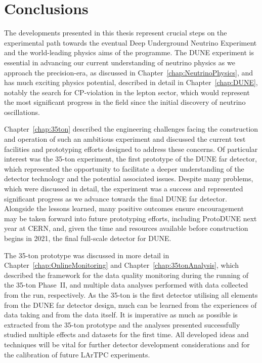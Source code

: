 
\chapter{Conclusions}\label{chap:Conclusions}

The developments presented in this thesis represent crucial steps on the experimental path towards the eventual Deep Underground Neutrino Experiment and the world-leading physics aims of the programme.  The DUNE experiment is essential in advancing our current understanding of neutrino physics as we approach the precision-era, as discussed in Chapter~\ref{chap:NeutrinoPhysics}, and has much exciting physics potential, described in detail in Chapter~\ref{chap:DUNE}, notably the search for CP-violation in the lepton sector, which would represent the most significant progress in the field since the initial discovery of neutrino oscillations.

Chapter~\ref{chap:35ton} described the engineering challenges facing the construction and operation of such an ambitious experiment and discussed the current test facilities and prototyping efforts designed to address these concerns.  Of particular interest was the 35-ton experiment, the first prototype of the DUNE far detector, which represented the opportunity to facilitate a deeper understanding of the detector technology and the potential associated issues.  Despite many problems, which were discussed in detail, the experiment was a success and represented significant progress as we advance towards the final DUNE far detector.  Alongside the lessons learned, many positive outcomes ensure encouragement may be taken forward into future prototyping efforts, including ProtoDUNE next year at CERN, and, given the time and resources available before construction begins in 2021, the final full-scale detector for DUNE.

The 35-ton prototype was discussed in more detail in Chapter~\ref{chap:OnlineMonitoring} and Chapter~\ref{chap:35tonAnalysis}, which described the framework for the data quality monitoring during the running of the 35-ton Phase~II, and multiple data analyses performed with data collected from the run, respectively.  As the 35-ton is the first detector utilising all elements from the DUNE far detector design, much can be learned from the experiences of data taking and from the data itself.  It is imperative as much as possible is extracted from the 35-ton prototype and the analyses presented successfully studied multiple effects and datasets for the first time.  All developed ideas and techniques will be vital for further detector development considerations and for the calibration of future LArTPC experiments.

